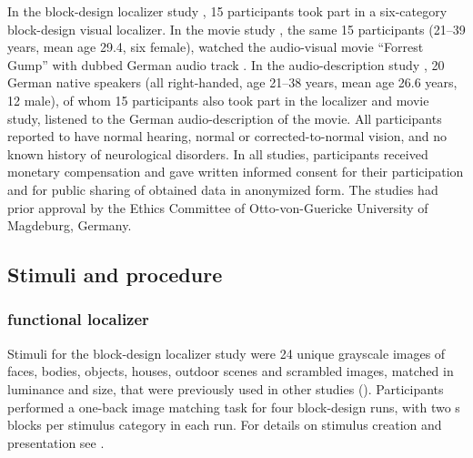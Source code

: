 In the block-design localizer study \citep{sengupta2016extension}, 15
participants took part in a six-category block-design visual localizer.
In the movie study \citep{hanke2016simultaneous}, the same 15 participants
(21–39 years, mean age 29.4, six female), watched the audio-visual movie
``Forrest Gump'' \citep{ForrestGumpMovie} with dubbed German audio track
\citep{ForrestGumpDVD}.
In the audio-description study \citep{hanke2014audiomovie}, 20 German native
speakers (all right-handed, age 21–38 years, mean age 26.6 years, 12 male), of
whom 15 participants also took part in the localizer and movie study, listened
to the German audio-description \citep{ForrestGumpGermanAD} of the movie.
All participants reported to have normal hearing, normal or corrected-to-normal
vision, and no known history of neurological disorders.
In all studies, participants received monetary compensation and gave written
informed consent for their participation and for public sharing of obtained data
in anonymized form. The studies had prior approval by the Ethics Committee of
Otto-von-Guericke University of Magdeburg, Germany.


\subsection{Stimuli and procedure}


\subsubsection{functional localizer}

Stimuli for the block-design localizer study were 24 unique grayscale images of
faces, bodies, objects, houses, outdoor scenes and scrambled images, matched in
luminance and size, that were previously used in other studies
(\citep[e.g.,][]{haxby2011common}).
Participants performed a one-back image matching task for four block-design
runs, with two \unit[16]{s} blocks per stimulus category in each run.
%
For details on stimulus creation and presentation see
\citet{sengupta2016extension}.


